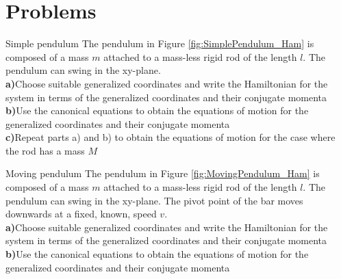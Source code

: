 \section{Problems}
\begin{problem}{Simple pendulum}
The pendulum in Figure \ref{fig:SimplePendulum_Ham} is composed of a mass $m$ attached to a mass-less rigid rod of the length $l$. The pendulum can swing in the xy-plane. 
\\
\textbf{a)}Choose suitable generalized coordinates and write the Hamiltonian for the system in terms of the generalized coordinates and their conjugate momenta\\
\textbf{b)}Use the canonical equations to obtain the equations of motion for the generalized coordinates and their conjugate momenta\\
\textbf{c)}Repeat parts a) and b) to obtain the equations of motion for the case where the rod has a mass $M$\\
\label{prob_Hamilton_1}
\end{problem}

\begin{problem}{Moving pendulum}
The pendulum in Figure \ref{fig:MovingPendulum_Ham} is composed of a mass $m$ attached to a mass-less rigid rod of the length $l$. The pendulum can swing in the xy-plane. The pivot point of the bar moves downwards at a fixed, known, speed $v$.
\\
\textbf{a)}Choose suitable generalized coordinates and write the Hamiltonian for the system in terms of the generalized coordinates and their conjugate momenta\\
\textbf{b)}Use the canonical equations to obtain the equations of motion for the generalized coordinates and their conjugate momenta\\
\label{prob_Hamilton_2}
\end{problem}


